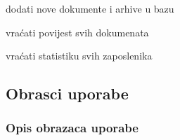 \begin{packed_enum}
				\item  {}
				
				\begin{packed_enum}
					
					\item dodati nove dokumente i arhive u bazu
					\item vraćati povijest svih dokumenata
					\item vraćati statistiku svih zaposlenika
					
				\end{packed_enum}	
			
			\end{packed_enum}
			
			
			\eject 
			
			
				
			\subsection{Obrasci uporabe}
				
				
				\subsubsection{Opis obrazaca uporabe}
				
